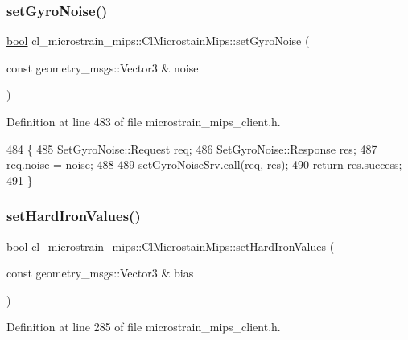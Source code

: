 \subsubsection{\texorpdfstring{set\+Gyro\+Noise()}{setGyroNoise()}}
{\footnotesize\ttfamily \hyperlink{classbool}{bool} cl\+\_\+microstrain\+\_\+mips\+::\+Cl\+Microstain\+Mips\+::set\+Gyro\+Noise (\begin{DoxyParamCaption}\item[{const geometry\+\_\+msgs\+::\+Vector3 \&}]{noise }\end{DoxyParamCaption})\hspace{0.3cm}{\ttfamily [inline]}}



Definition at line 483 of file microstrain\+\_\+mips\+\_\+client.\+h.


\begin{DoxyCode}
484     \{
485         SetGyroNoise::Request req;
486         SetGyroNoise::Response res;
487         req.noise = noise;
488 
489         \hyperlink{classcl__microstrain__mips_1_1ClMicrostainMips_a712c389ca54fa2ebe89ffd601b03bd37}{setGyroNoiseSrv}.call(req, res);
490         \textcolor{keywordflow}{return} res.success;
491     \}
\end{DoxyCode}
\mbox{\label{classcl__microstrain__mips_1_1ClMicrostainMips_a6f9ae5ca80db4a93db8b01192d38b426}} 
\subsubsection{\texorpdfstring{set\+Hard\+Iron\+Values()}{setHardIronValues()}}
{\footnotesize\ttfamily \hyperlink{classbool}{bool} cl\+\_\+microstrain\+\_\+mips\+::\+Cl\+Microstain\+Mips\+::set\+Hard\+Iron\+Values (\begin{DoxyParamCaption}\item[{const geometry\+\_\+msgs\+::\+Vector3 \&}]{bias }\end{DoxyParamCaption})\hspace{0.3cm}{\ttfamily [inline]}}



Definition at line 285 of file microstrain\+\_\+mips\+\_\+client.\+h.


